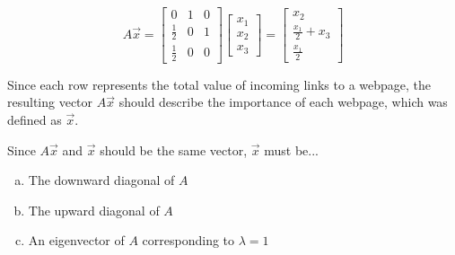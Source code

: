 \begin{applicationActivities}{5}{29}
\begin{activity}{5}
  \begin{multicols}{2}
  \begin{center}
  \end{center}

  \[
    A\vec{x}
      =
    \begin{bmatrix}
      0 & 1 & 0 \\
      \frac{1}{2} & 0 & 1 \\
      \frac{1}{2} & 0 & 0
    \end{bmatrix}
    \begin{bmatrix}
      x_1 \\ x_2 \\ x_3
    \end{bmatrix}
      =
    \begin{bmatrix}
      x_2 \\
      \frac{x_1}{2}+x_3 \\
      \frac{x_1}{2}
    \end{bmatrix}
  \]
  \end{multicols}

Since each row represents the total value of incoming links to a webpage,
the resulting vector \(A\vec{x}\) should describe
the importance of each webpage, which was defined as \(\vec{x}\).

Since \(A\vec{x}\) and \(\vec{x}\) should be the same vector,
\(\vec{x}\) must be...

\begin{enumerate}[a)]
  \item The downward diagonal of \(A\)
  \item The upward diagonal of \(A\)
  \item An eigenvector of \(A\) corresponding to \(\lambda=1\)
\end{enumerate}
\end{activity}


\end{applicationActivities}
